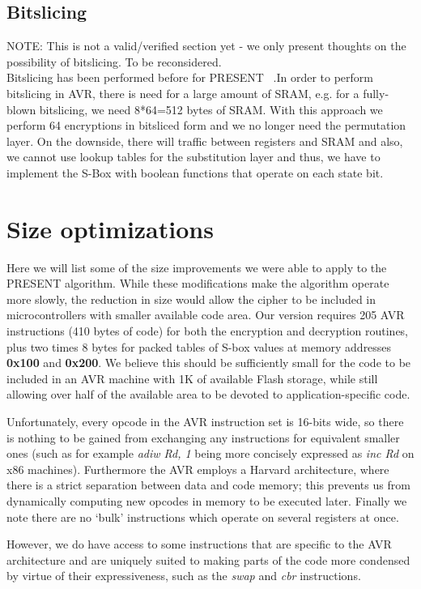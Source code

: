 \documentclass{llncs}
\begin{document}
\subsection{Bitslicing}
NOTE: This is not a valid/verified section yet - we only present thoughts on the possibility of bitslicing. To be reconsidered.\\
Bitslicing has been performed before for PRESENT ~\cite{grabher2008light}.In order to perform bitslicing in AVR, there is need for a large amount of SRAM, e.g. for a fully-blown bitslicing, we need 8*64=512 bytes of SRAM. With this approach we perform 64 encryptions in bitsliced form and we no longer need the permutation layer. On the downside, there will traffic between registers and SRAM and also, we cannot use lookup tables for the substitution layer and thus, we have to implement the S-Box with boolean functions that operate on each state bit.

\section{Size optimizations}

Here we will list some of the size improvements we were able to apply to the PRESENT algorithm.
While these modifications make the algorithm operate more slowly, the reduction in size would allow the cipher to be included in microcontrollers with smaller available code area.
Our version requires 205 AVR instructions (410 bytes of code) for both the encryption and decryption routines, plus two times 8 bytes for packed tables of S-box values at memory addresses \textbf{0x100} and \textbf{0x200}.
We believe this should be sufficiently small for the code to be included in an AVR machine with 1K of available Flash storage, while still allowing over half of the available area to be devoted to application-specific code.

Unfortunately, every opcode in the AVR instruction set is 16-bits wide, so there is nothing to be gained from exchanging any instructions for equivalent smaller ones (such as for example \textit{adiw Rd, 1} being more concisely expressed as \textit{inc Rd} on x86 machines).
Furthermore the AVR employs a Harvard architecture, where there is a strict separation between data and code memory; this prevents us from dynamically computing new opcodes in memory to be executed later.
Finally we note there are no `bulk' instructions which operate on several registers at once.

However, we do have access to some instructions that are specific to the AVR architecture and are uniquely suited to making parts of the code more condensed by virtue of their expressiveness, such as the \textit{swap} and \textit{cbr} instructions.
\end{document}
